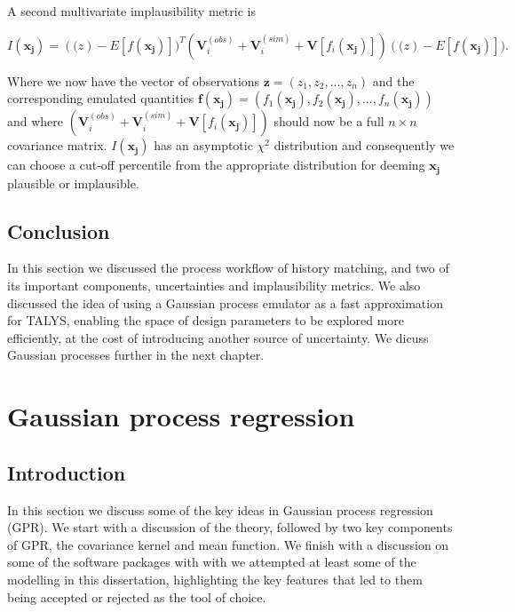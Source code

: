 \documentclass[
  12pt,
  a4paper,
  twoside]{book}
\begin{document}
A second multivariate implausibility metric is

\begin{equation}
\label{eq:chi-sq-impl}
I(\mathbf{x_j}) = (\mathbf(z) - E[f(\mathbf{x_j})])^T\left(\mathbf{V}_i^{(obs)} + \mathbf{V}_i^{(sim)} + \mathbf{V}[f_i(\mathbf{x_j})]\right)(\mathbf(z) - E[f(\mathbf{x_j})]).
\end{equation}

Where we now have the vector of observations \(\mathbf{z} = (z_1,z_2,...,z_n)\) and the corresponding emulated quantities \(\mathbf{f(x_j)} = (f_1(\mathbf{x_j}),f_2(\mathbf{x_j}),...,f_n(\mathbf{x_j}))\) and where \(\left(\mathbf{V}_i^{(obs)} + \mathbf{V}_i^{(sim)} + \mathbf{V}[f_i(\mathbf{x_j})]\right)\) should now be a full \(n \times n\) covariance matrix. \(I(\mathbf{x_j})\) has an asymptotic \(\chi^2\) distribution and consequently we can choose a cut-off percentile from the appropriate distribution for deeming \(\mathbf{x_j}\) plausible or implausible.

\hypertarget{conclusion-2}{%
\section{Conclusion}\label{conclusion-2}}

In this section we discussed the process workflow of history matching, and two of its important components, uncertainties and implausibility metrics. We also discussed the idea of using a Gaussian process emulator as a fast approximation for TALYS, enabling the space of design parameters to be explored more efficiently, at the cost of introducing another source of uncertainty. We dicuss Gaussian processes further in the next chapter.

\hypertarget{GPR}{%
\chapter{Gaussian process regression}\label{GPR}}

\hypertarget{introduction-2}{%
\section{Introduction}\label{introduction-2}}

In this section we discuss some of the key ideas in Gaussian process regression (GPR). We start with a discussion of the theory, followed by two key components of GPR, the covariance kernel and mean function. We finish with a discussion on some of the software packages with with we attempted at least some of the modelling in this dissertation, highlighting the key features that led to them being accepted or rejected as the tool of choice.
\end{document}
